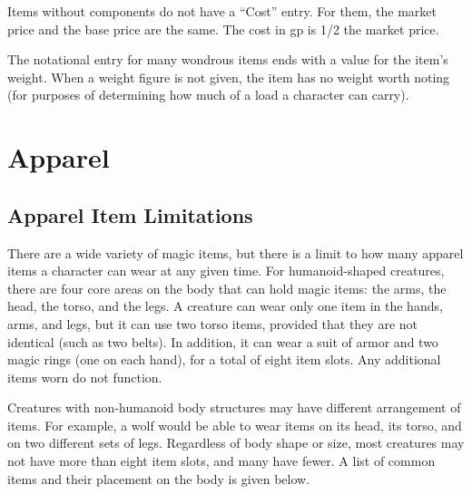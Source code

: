     Items without components do not have a ``Cost'' entry.
    For them, the market price and the base price are the same.
    The cost in gp is 1/2 the market price.

     The notational entry for many wondrous items ends with a value for the item's weight.
    When a weight figure is not given, the item has no weight worth noting (for purposes of determining how much of a load a character can carry).

\section{Apparel}

    \subsection{Apparel Item Limitations}

        There are a wide variety of magic items, but there is a limit to how many apparel items a character can wear at any given time.
        For humanoid-shaped creatures, there are four core areas on the body that can hold magic items: the arms, the head, the torso, and the legs.
        A creature can wear only one item in the hands, arms, and legs, but it can use two torso items, provided that they are not identical (such as two belts).
        In addition, it can wear a suit of armor and two magic rings (one on each hand), for a total of eight item slots.
        Any additional items worn do not function.

        Creatures with non-humanoid body structures may have different arrangement of items.
        For example, a wolf would be able to wear items on its head, its torso, and on two different sets of legs.
        Regardless of body shape or size, most creatures may not have more than eight item slots, and many have fewer.
        A list of common items and their placement on the body is given below.

